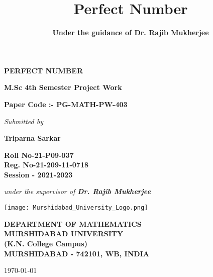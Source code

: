\documentclass[12pt,,a4paper]{article}
\title{\textbf{Perfect Number}}
\author{\textbf{Under the guidance of Dr. Rajib Mukherjee }}
\begin{document}
\onecolumn

\thispagestyle{empty}

\begin{center}

\textbf{\fontsize{28}{\baselineskip}\selectfont\color{blue} PERFECT NUMBER}

\vspace*{1.2cm}

\textbf{\fontsize{22}{\baselineskip}\selectfont M.Sc 4th Semester Project Work}

\bigskip

\textbf{\fontsize{16}{\baselineskip}\selectfont Paper Code :- PG-MATH-PW-403}

\bigskip


\textit{\fontsize{18}{\baselineskip}\selectfont Submitted  by}


\bigskip

\textbf{\fontsize{24}{\baselineskip}\selectfont\color{magenta} Triparna Sarkar } 


\bigskip

\textbf{\large{Roll No-21-P09-037\vspace*{0.5cm}\\Reg. No-21-209-11-0718\vspace*{0.5cm}\\ Session - 2021-2023}}


\bigskip
\textit{\fontsize{17}{\baselineskip}\selectfont under the supervisor of \color{red}\textbf{Dr. Rajib Mukherjee } }
\vspace*{0.5cm}
\begin{center}
    
\texttt{[image: Murshidabad\_University\_Logo.png]}
\end{center}
\vspace*{0.5cm}
\textbf{\fontsize{14}{\baselineskip}\selectfont DEPARTMENT OF MATHEMATICS\vspace*{0.5cm}\\\color{blue} MURSHIDABAD UNIVERSITY\vspace*{0.5cm}\\\color{darkgray} (K.N. College Campus)\\\vspace*{0.5cm}\color{black}\small MURSHIDABAD - 742101, WB, INDIA\\ \vspace*{0.2cm}}

{\today}
\end{center}
\end{document}
